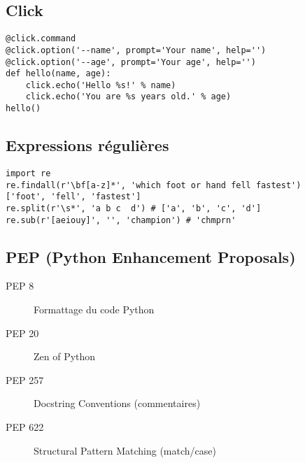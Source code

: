 \documentclass{article}
\begin{document}
\begin{multicols*}{4}
\subsection*{Click}
\begin{lstlisting}
@click.command
@click.option('--name', prompt='Your name', help='')
@click.option('--age', prompt='Your age', help='')
def hello(name, age):
    click.echo('Hello %s!' % name)
    click.echo('You are %s years old.' % age)
hello() 
\end{lstlisting}

\subsection*{Expressions régulières}
\begin{lstlisting}
import re 
re.findall(r'\bf[a-z]*', 'which foot or hand fell fastest')
['foot', 'fell', 'fastest']
re.split(r'\s*', 'a b c  d') # ['a', 'b', 'c', 'd']
re.sub(r'[aeiouy]', '', 'champion') # 'chmprn'
\end{lstlisting}

\subsection*{PEP (Python Enhancement Proposals)}
\begin{description}
    \item[PEP 8] Formattage du code Python
    \item[PEP 20] Zen of Python 
    \item[PEP 257] Docstring Conventions (commentaires)
    \item[PEP 622] Structural Pattern Matching (match/case)  
\end{description}

\end{multicols*}
\end{document}
